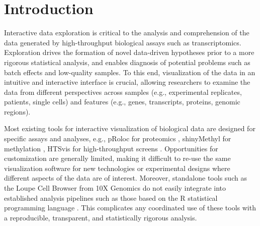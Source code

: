 \documentclass{bioinfo}
\begin{document}
\maketitle

\section{Introduction}
Interactive data exploration is critical to the analysis and comprehension of the data generated by high-throughput biological assays such as transcriptomics. 
Exploration drives the formation of novel data-driven hypotheses prior to a more rigorous statistical analysis, and enables diagnosis of potential problems such as batch effects and low-quality samples. 
To this end, visualization of the data in an intuitive and interactive interface is crucial, allowing researchers to examine the data from different perspectives across samples (e.g., experimental replicates, patients, single cells) and features (e.g., genes, transcripts, proteins, genomic regions).

Most existing tools for interactive visualization of biological data are designed for specific assays and analyses, e.g., pRoloc for proteomics \citep{gatto2014mass}, shinyMethyl for methylation \citep{fortin2014shinymethyl}, HTSvis for high-throughput screens \citep{scheeder2017htsvis}.
Opportunities for customization are generally limited, making it difficult to re-use the same visualization software for new technologies or experimental designs where different aspects of the data are of interest. 
Moreover, standalone tools such as the Loupe Cell Browser from 10X Genomics \citep{zheng2017massively} do not easily integrate into established analysis pipelines such as those based on the R statistical programming language \citep{rcore2008R}. 
This complicates any coordinated use of these tools with a reproducible, transparent, and statistically rigorous analysis. 
\end{document}
